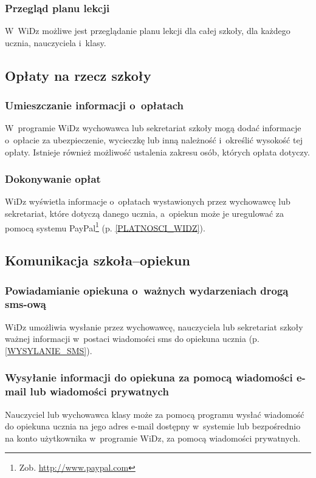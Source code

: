 \documentclass[12pt,leqno,twoside]{mwart}
\begin{document}
\subsubsection{Przegląd planu lekcji}
\noindent W~WiDz możliwe jest przeglądanie planu lekcji dla całej szkoły, dla każdego ucznia, nauczyciela i~klasy.

\subsection{Opłaty na rzecz szkoły}
\subsubsection{Umieszczanie informacji o~opłatach}
\noindent W~programie WiDz wychowawca lub sekretariat szkoły mogą dodać informacje o~opłacie za ubezpieczenie, wycieczkę lub inną należność i~określić wysokość tej opłaty. Istnieje również możliwość ustalenia zakresu osób, których opłata dotyczy.

\subsubsection{Dokonywanie opłat}
\noindent WiDz wyświetla informacje o~opłatach wystawionych przez wychowawcę lub sekretariat, które dotyczą danego ucznia, a~opiekun może je uregulować za pomocą systemu PayPal\footnote{Zob. \url{http://www.paypal.com}} (p. \ref{PLATNOSCI_WIDZ}). 

\subsection{Komunikacja szkoła--opiekun}
\subsubsection{Powiadamianie opiekuna o~ważnych wydarzeniach drogą sms-ową}
\noindent WiDz umożliwia wysłanie przez wychowawcę, nauczyciela lub sekretariat szkoły ważnej informacji w~postaci wiadomości sms do opiekuna ucznia  (p. \ref{WYSYLANIE_SMS}).

\subsubsection{Wysyłanie informacji do opiekuna za pomocą wiadomości e-mail lub wiadomości prywatnych}
\noindent Nauczyciel lub wychowawca klasy może za pomocą programu wysłać wiadomość do opiekuna ucznia na jego adres e-mail dostępny w~systemie lub bezpośrednio na konto użytkownika w~programie WiDz, za pomocą wiadomości prywatnych.
\end{document}

